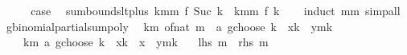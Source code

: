 \begin{isabellebody}
\ \ \isamarkupfalse%
\ \isamarkupfalse%
\ {\isacharquery}{\kern0pt}case\ \isacommand{{\isachardot}{\kern0pt}}\isamarkupfalse%
\isanewline
{}\isamarkupfalse%
%
\endisatagproof
{\isafoldproof}%
%
\isadelimproof
\isanewline
%
\endisadelimproof
\isanewline
{}\isamarkupfalse%
\ sum{\isacharunderscore}{\kern0pt}bounds{\isacharunderscore}{\kern0pt}lt{\isacharunderscore}{\kern0pt}plus{}{\isacharcolon}{\kern0pt}\ {\isachardoublequoteopen}{\isacharparenleft}{\kern0pt}{\isasymSum}k{\isacharless}{\kern0pt}mm{\isachardot}{\kern0pt}\ f\ {\isacharparenleft}{\kern0pt}Suc\ k{\isacharparenright}{\kern0pt}{\isacharparenright}{\kern0pt}\ {\isacharequal}{\kern0pt}\ {\isacharparenleft}{\kern0pt}{\isasymSum}k{\isacharequal}{\kern0pt}{}{\isachardot}{\kern0pt}{\isachardot}{\kern0pt}mm{\isachardot}{\kern0pt}\ f\ k{\isacharparenright}{\kern0pt}{\isachardoublequoteclose}\isanewline
%
\isadelimproof
\ \ %
\endisadelimproof
%
\isatagproof
{}\isamarkupfalse%
\ {\isacharparenleft}{\kern0pt}induct\ mm{\isacharparenright}{\kern0pt}\ simp{\isacharunderscore}{\kern0pt}all%
\endisatagproof
{\isafoldproof}%
%
\isadelimproof
\isanewline
%
\endisadelimproof
\isanewline
{}\isamarkupfalse%
\ gbinomial{\isacharunderscore}{\kern0pt}partial{\isacharunderscore}{\kern0pt}sum{\isacharunderscore}{\kern0pt}poly{\isacharcolon}{\kern0pt}\isanewline
\ \ {\isachardoublequoteopen}{\isacharparenleft}{\kern0pt}{\isasymSum}k{\isasymle}m{\isachardot}{\kern0pt}\ {\isacharparenleft}{\kern0pt}of{\isacharunderscore}{\kern0pt}nat\ m\ {\isacharplus}{\kern0pt}\ a\ gchoose\ k{\isacharparenright}{\kern0pt}\ {\isacharasterisk}{\kern0pt}\ x{\isacharcircum}{\kern0pt}k\ {\isacharasterisk}{\kern0pt}\ y{\isacharcircum}{\kern0pt}{\isacharparenleft}{\kern0pt}m{\isacharminus}{\kern0pt}k{\isacharparenright}{\kern0pt}{\isacharparenright}{\kern0pt}\ {\isacharequal}{\kern0pt}\isanewline
\ \ \ \ {\isacharparenleft}{\kern0pt}{\isasymSum}k{\isasymle}m{\isachardot}{\kern0pt}\ {\isacharparenleft}{\kern0pt}{\isacharminus}{\kern0pt}a\ gchoose\ k{\isacharparenright}{\kern0pt}\ {\isacharasterisk}{\kern0pt}\ {\isacharparenleft}{\kern0pt}{\isacharminus}{\kern0pt}x{\isacharparenright}{\kern0pt}{\isacharcircum}{\kern0pt}k\ {\isacharasterisk}{\kern0pt}\ {\isacharparenleft}{\kern0pt}x\ {\isacharplus}{\kern0pt}\ y{\isacharparenright}{\kern0pt}{\isacharcircum}{\kern0pt}{\isacharparenleft}{\kern0pt}m{\isacharminus}{\kern0pt}k{\isacharparenright}{\kern0pt}{\isacharparenright}{\kern0pt}{\isachardoublequoteclose}\isanewline
\ \ {\isacharparenleft}{\kern0pt}\ {\isachardoublequoteopen}{\isacharquery}{\kern0pt}lhs\ m\ {\isacharequal}{\kern0pt}\ {\isacharquery}{\kern0pt}rhs\ m{\isachardoublequoteclose}{\isacharparenright}{\kern0pt}\isanewline

\end{isabellebody}
